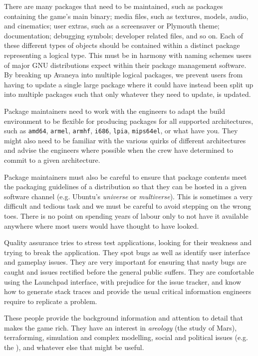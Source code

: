 There are many packages that need to be maintained, such as packages containing the game's main binary; media files, such as textures, models, audio, and cinematics; user extras, such as a screensaver or Plymouth theme; documentation; debugging symbols; developer related files, and so on. Each of these different types of objects should be contained within a distinct package representing a logical type. This must be in harmony with naming schemes users of major GNU distributions expect within their package management software. By breaking up Avaneya into multiple logical packages, we prevent users from having to update a single large package where it could have instead been split up into multiple packages such that only whatever they need to update, is updated.

Package maintainers need to work with the engineers to adapt the build environment to be flexible for producing packages for all supported architectures, such as {\tt amd64}, {\tt armel}, {\tt armhf}, {\tt i686}, {\tt lpia}, {\tt mips64el}, or what have you. They might also need to be familiar with the various quirks of different architectures and advise the engineers where possible when the crew have determined to commit to a given architecture.

Package maintainers must also be careful to ensure that package contents meet the packaging guidelines of a distribution so that they can be hosted in a given software channel (e.g. Ubuntu's {\it universe} or {\it multiverse}). This is sometimes a very difficult and tedious task and we must be careful to avoid stepping on the wrong toes. There is no point on spending years of labour only to not have it available anywhere where most users would have thought to have looked.


Quality assurance tries to stress test applications, looking for their weakness and trying to break the application. They spot bugs as well as identify user interface and gameplay issues. They are very important for ensuring that nasty bugs are caught and issues rectified before the general public suffers. They are comfortable using the Launchpad interface, with prejudice for the issue tracker, and know how to generate stack traces and provide the usual critical information engineers require to replicate a problem.


These people provide the background information and attention to detail that makes the game rich. They have an interest in {\it areology} (the study of Mars), terraforming, simulation and complex modelling, social and political issues (e.g. the ), and whatever else that might be useful.

